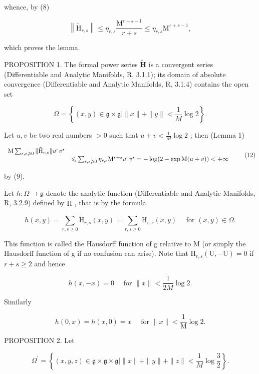 whence, by (8)

\[
\left\| \tilde {\mathrm{H}} _ {r, s} \right\| \leqslant   \eta_ {r, s} \frac {\mathrm{M} ^ {r + s - 1}}{r + s} \leqslant \eta_ {r, s} \mathrm{M} ^ {r + s - 1},
\]

which proves the lemma.

PROPOSITION 1. The formal power series \(\tilde{\mathbf{H}}\) is a convergent series (Differentiable and Analytic Manifolds, R, 3.1.1); its domain of absolute convergence (Differentiable and Analytic Manifolds, R, 3.1.4) contains the open set

\[
\Omega = \left\{(x, y) \in \mathfrak {g} \times \mathfrak {g} | \| x \| + \| y \| <   \frac {1}{M} \log 2 \right\}.
\]

Let \(u, v\) be two real numbers \(> 0\) such that \(u + v < \frac{1}{M} \log 2\) ; then (Lemma 1)

\[
\begin{array}{r l} \mathrm{M} \sum_ {r, s \geqslant 0} \| \tilde {\mathrm{H}} _ {r, s} \| u ^ {r} v ^ {s} \\ & \leqslant \sum_ {r, s \geqslant 0} \eta_ {r, s} \mathrm{M} ^ {r + s} u ^ {r} v ^ {s} = - \log (2 - \exp \mathrm{M} (u + v)) <   + \infty \end{array} \tag {12}
\]

by (9).

Let \(h: \Omega \to \mathfrak{g}\) denote the analytic function (Differentiable and Analytic Manifolds, R, 3.2.9) defined by \(\tilde{\mathrm{H}}\) , that is by the formula

\[
h (x, y) = \sum_ {r, s \geqslant 0} \tilde {\mathrm{H}} _ {r, s} (x, y) = \sum_ {r, s \geqslant 0} \mathrm{H} _ {r, s} (x, y) \quad \text { for } (x, y) \in \Omega .\tag{13}
\]

This function is called the Hausdorff function of g relative to M (or simply the Hausdorff function of g if no confusion can arise). Note that \(\mathrm{H}_{r,s}(\mathrm{U}, -\mathrm{U}) = 0\) if \(r + s \geqslant 2\) and hence

\[
h (x, - x) = 0 \quad \text { for } \| x \| <   \frac {1}{2 M} \log 2.\tag{14}
\]

Similarly

\[
h (0, x) = h (x, 0) = x \quad \text { for } \| x \| <   \frac {1}{\mathrm{M}} \log 2.\tag{15}
\]

PROPOSITION 2. Let

\[
\Omega^ {\prime} = \left\{(x, y, z) \in \mathfrak {g} \times \mathfrak {g} \times \mathfrak {g} | \| x \| + \| y \| + \| z \| <   \frac {1}{M} \log \frac {3}{2} \right\}.
\]

